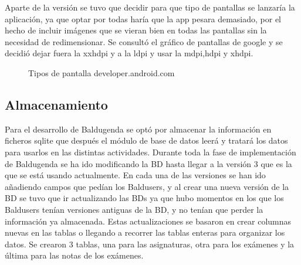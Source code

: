 Aparte de la versión se tuvo que decidir para que tipo de pantallas se lanzaría la aplicación, ya que optar por todas haría que la app pesara demasiado, por el hecho de incluir imágenes que se vieran bien en todas las pantallas sin la necesidad de redimensionar.
Se consultó el gráfico de pantallas de google y se decidió dejar fuera la xxhdpi y a la ldpi y usar la mdpi,hdpi y xhdpi.

\begin{figure}[H] 
  \begin{center} 
    \caption{Tipos de pantalla developer.android.com} 
    \label{fig:TiposPantalla} 
  \end{center} 
\end{figure}

\subsection{Almacenamiento}
\label{subsecc:Almacenamiento}

Para el desarrollo de Baldugenda se optó por almacenar la información en ficheros sqlite que después el módulo de base de datos leerá y tratará los datos para usarlos en las distintas actividades.
Durante toda la fase de implementación de Baldugenda se ha ido modificando la BD hasta llegar a la versión 3 que es la que se está usando actualmente.
En cada una de las versiones se han ido añadiendo campos que pedían los Baldusers, y al crear una nueva versión de la BD se tuvo que ir actualizando las BDs ya que hubo momentos en los que los Baldusers tenían versiones antiguas de la BD, y no tenían que perder la información ya almacenada.
Estas actualizaciones se basaron en crear columnas nuevas en las tablas o llegando a recorrer las tablas enteras para organizar los datos.
Se crearon 3 tablas, una para las asignaturas, otra para los exámenes y la última para las notas de los exámenes.


